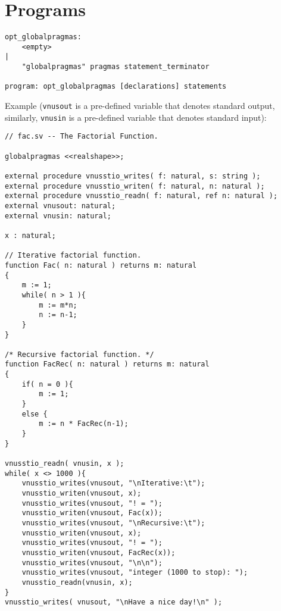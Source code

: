 \documentclass[a4paper]{article}
\begin{document}
\section{Programs}
\begin{verbatim}
opt_globalpragmas:
    <empty>
|
    "globalpragmas" pragmas statement_terminator

program: opt_globalpragmas [declarations] statements
\end{verbatim}
Example (\verb"vnusout" is a pre-defined variable that denotes
standard output, similarly, \verb"vnusin" is a pre-defined variable that
denotes standard input):
\begin{verbatim}
// fac.sv -- The Factorial Function.

globalpragmas <<realshape>>;

external procedure vnusstio_writes( f: natural, s: string );
external procedure vnusstio_writen( f: natural, n: natural );
external procedure vnusstio_readn( f: natural, ref n: natural );
external vnusout: natural;
external vnusin: natural;

x : natural;

// Iterative factorial function.
function Fac( n: natural ) returns m: natural 
{
    m := 1;
    while( n > 1 ){
        m := m*n;
        n := n-1;
    }
}

/* Recursive factorial function. */
function FacRec( n: natural ) returns m: natural 
{
    if( n = 0 ){
        m := 1;
    }
    else {
        m := n * FacRec(n-1);
    }
}

vnusstio_readn( vnusin, x );
while( x <> 1000 ){
    vnusstio_writes(vnusout, "\nIterative:\t");
    vnusstio_writen(vnusout, x);
    vnusstio_writes(vnusout, "! = ");
    vnusstio_writen(vnusout, Fac(x));
    vnusstio_writes(vnusout, "\nRecursive:\t");
    vnusstio_writen(vnusout, x);
    vnusstio_writes(vnusout, "! = ");
    vnusstio_writen(vnusout, FacRec(x));
    vnusstio_writes(vnusout, "\n\n");
    vnusstio_writes(vnusout, "integer (1000 to stop): ");
    vnusstio_readn(vnusin, x);
}
vnusstio_writes( vnusout, "\nHave a nice day!\n" );
\end{verbatim}
\end{document}
